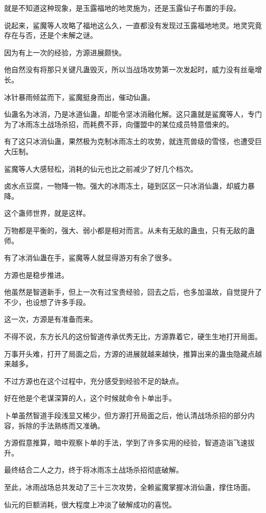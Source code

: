 \begin{this_body}
就是不知道这种现象，是玉露福地的地灵施为，还是玉露仙子布置的手段。

说起来，鲨魔等人攻略了福地这么久，一直都没有发现过玉露福地地灵。地灵究竟存在与否，还是个未解之谜。

因为有上一次的经验，方源进展颇快。

他自然没有将那只关键凡蛊毁灭，所以当战场攻势第一次发起时，威力没有丝毫增长。

冰针暴雨倾盆而下，鲨魔挺身而出，催动仙蛊。

仙蛊名为冰消，乃是冰道仙蛊，却能令坚冰消融化解。这只蛊就是鲨魔等人，专门为了冰雨冻土战场杀招，而耗费不菲，向僵盟中的某位成员特意借来的。

有了这只冰消仙蛊，果然极为克制冰雨冻土的攻势，就连荒兽级的雪怪，也遭受巨大压制。

鲨魔等人大感轻松，消耗的仙元也比之前减少了好几个档次。

卤水点豆腐，一物降一物。强大的冰雨冻土，碰到区区一只冰消仙蛊，却威力暴降。

这个蛊师世界，就是这样。

万物都是平衡的，强大、弱小都是相对而言。从未有无敌的蛊虫，只有无敌的蛊师。

有了冰消仙蛊在手，鲨魔等人就显得游刃有余了很多。

方源也是稳步推进。

他虽然是智道新手，但上一次有过宝贵经验，回去之后，也多加温故，自觉提升了不少，也设想了许多手段。

这一次，方源是有准备而来。

不得不说，东方长凡的这份智道传承优秀无比，方源靠着它，硬生生地打开局面。

万事开头难，打开了局面之后，方源的进展就越来越快，推算出来的蛊虫隐藏点越来越多。

不过方源也在这个过程中，充分感受到经验不足的缺点。

好在他是个老谋深算的人，这个时候就命令卜单出手。

卜单虽然智道手段浅显又稀少，但方源打开局面之后，他认清战场杀招的部分内容，拆除的手法熟练而又准确。

方源假意推算，暗中观察卜单的手法，学到了许多实用的经验，智道造诣飞速拔升。

最终结合二人之力，终于将冰雨冻土战场杀招彻底破解。

至此，冰雨战场总共发动了三十三次攻势，全赖鲨魔掌握冰消仙蛊，撑住场面。

仙元的巨额消耗，很大程度上冲淡了破解成功的喜悦。

\end{this_body}

